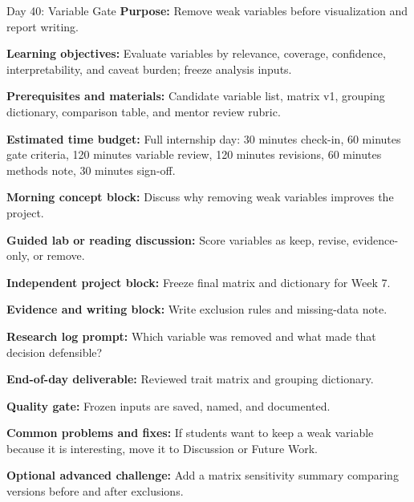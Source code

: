 \begin{dailybox}{Day 40: Variable Gate}
\textbf{Purpose:} Remove weak variables before visualization and report writing.

\textbf{Learning objectives:} Evaluate variables by relevance, coverage, confidence, interpretability, and caveat burden; freeze analysis inputs.

\textbf{Prerequisites and materials:} Candidate variable list, matrix v1, grouping dictionary, comparison table, and mentor review rubric.

\textbf{Estimated time budget:} Full internship day: 30 minutes check-in, 60 minutes gate criteria, 120 minutes variable review, 120 minutes revisions, 60 minutes methods note, 30 minutes sign-off.

\textbf{Morning concept block:} Discuss why removing weak variables improves the project.

\textbf{Guided lab or reading discussion:} Score variables as keep, revise, evidence-only, or remove.

\textbf{Independent project block:} Freeze final matrix and dictionary for Week 7.

\textbf{Evidence and writing block:} Write exclusion rules and missing-data note.

\textbf{Research log prompt:} Which variable was removed and what made that decision defensible?

\textbf{End-of-day deliverable:} Reviewed trait matrix and grouping dictionary.

\textbf{Quality gate:} Frozen inputs are saved, named, and documented.

\textbf{Common problems and fixes:} If students want to keep a weak variable because it is interesting, move it to Discussion or Future Work.

\textbf{Optional advanced challenge:} Add a matrix sensitivity summary comparing versions before and after exclusions.
\end{dailybox}

